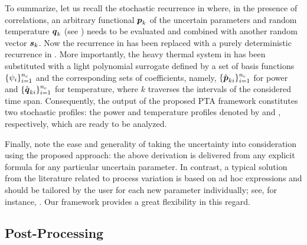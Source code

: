 To summarize, let us recall the stochastic recurrence in 
where, in the presence of correlations, an arbitrary functional $\boldsymbol{p}_k$ of the
uncertain parameters \vu and random temperature $\boldsymbol{q}_k$ (see )
needs to be evaluated and combined with another random vector $\boldsymbol{s}_k$. Now the
recurrence in  has been replaced with a purely deterministic
recurrence in . More importantly, the heavy thermal system
in  has been substituted with a light polynomial surrogate
defined by a set of basis functions $\{ \psi_i \}_{i = 1}^{n_\mathrm{c}}$ and the
corresponding sets of coefficients, namely, $\{ \hat{\boldsymbol{p}}_{ki} \}_{i = 1}^{n_\mathrm{c}}$
for power and $\{ \hat{\boldsymbol{q}}_{ki} \}_{i = 1}^{n_\mathrm{c}}$ for temperature, where $k$
traverses the \ns intervals of the considered time span. Consequently, the
output of the proposed PTA framework constitutes two stochastic profiles: the
power and temperature profiles denoted by \mp and \mq, respectively, which are
ready to be analyzed.

Finally, note the ease and generality of taking the uncertainty into
consideration using the proposed approach: the above derivation is delivered
from any explicit formula for any particular uncertain parameter. In contrast, a
typical solution from the literature related to process variation is based on ad
hoc expressions and should be tailored by the user for each new parameter
individually; see, for instance, \cite{huang2009a, bhardwaj2008, ghanta2006}.
Our framework provides a great flexibility in this regard.

\subsection{Post-Processing}

